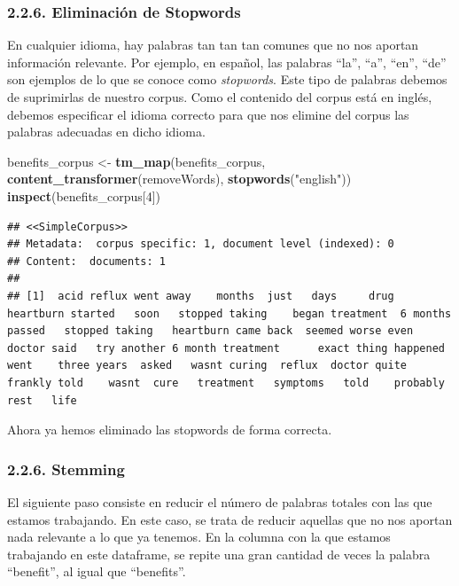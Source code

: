 \documentclass[spanish,]{article}
\newenvironment{Shaded}{\begin{snugshade}}{\end{snugshade}}
\newcommand{\DecValTok}[1]{\textcolor[rgb]{0.00,0.00,0.81}{#1}}
\newcommand{\KeywordTok}[1]{\textcolor[rgb]{0.13,0.29,0.53}{\textbf{#1}}}
\newcommand{\NormalTok}[1]{#1}
\newcommand{\StringTok}[1]{\textcolor[rgb]{0.31,0.60,0.02}{#1}}
\begin{document}
\hypertarget{eliminacion-de-stopwords}{%
\subsubsection{2.2.6. Eliminación de
Stopwords}\label{eliminacion-de-stopwords}}

En cualquier idioma, hay palabras tan tan tan comunes que no nos aportan
información relevante. Por ejemplo, en español, las palabras ``la'',
``a'', ``en'', ``de'' son ejemplos de lo que se conoce como
\textit{stopwords}. Este tipo de palabras debemos de suprimirlas de
nuestro corpus. Como el contenido del corpus está en inglés, debemos
especificar el idioma correcto para que nos elimine del corpus las
palabras adecuadas en dicho idioma.

\begin{Shaded}
\begin{Highlighting}[]
\NormalTok{benefits_corpus <-}\StringTok{ }\KeywordTok{tm_map}\NormalTok{(benefits_corpus, }\KeywordTok{content_transformer}\NormalTok{(removeWords), }
          \KeywordTok{stopwords}\NormalTok{(}\StringTok{"english"}\NormalTok{))}
\KeywordTok{inspect}\NormalTok{(benefits_corpus[}\DecValTok{4}\NormalTok{])}
\end{Highlighting}
\end{Shaded}

\begin{verbatim}
## <<SimpleCorpus>>
## Metadata:  corpus specific: 1, document level (indexed): 0
## Content:  documents: 1
## 
## [1]  acid reflux went away    months  just   days     drug  heartburn started   soon   stopped taking    began treatment  6 months passed   stopped taking   heartburn came back  seemed worse even  doctor said   try another 6 month treatment      exact thing happened  went    three years  asked   wasnt curing  reflux  doctor quite frankly told    wasnt  cure   treatment   symptoms   told    probably      rest   life
\end{verbatim}

Ahora ya hemos eliminado las stopwords de forma correcta.

\hypertarget{stemming}{%
\subsubsection{2.2.6. Stemming}\label{stemming}}

El siguiente paso consiste en reducir el número de palabras totales con
las que estamos trabajando. En este caso, se trata de reducir aquellas
que no nos aportan nada relevante a lo que ya tenemos. En la columna con
la que estamos trabajando en este dataframe, se repite una gran cantidad
de veces la palabra ``benefit'', al igual que ``benefits''.
\end{document}
